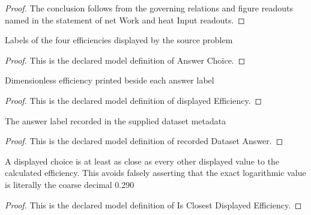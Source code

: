 \begin{proof}
  The conclusion follows from the governing relations and figure readouts named in the statement of net Work and heat Input readouts.
\end{proof}
\begin{definition}
  \label{def:physics:phyx-mini-0432:phyxminiproblems-problemphyxmini0432-answerchoice}
  Labels of the four efficiencies displayed by the source problem
\end{definition}
\begin{proof}
  This is the declared model definition of Answer Choice.
\end{proof}
\begin{definition}
  \label{def:physics:phyx-mini-0432:phyxminiproblems-problemphyxmini0432-displayedefficiency}
  Dimensionless efficiency printed beside each answer label
\end{definition}
\begin{proof}
  This is the declared model definition of displayed Efficiency.
\end{proof}
\begin{definition}
  \label{def:physics:phyx-mini-0432:phyxminiproblems-problemphyxmini0432-recordeddatasetanswer}
  The answer label recorded in the supplied dataset metadata
\end{definition}
\begin{proof}
  This is the declared model definition of recorded Dataset Answer.
\end{proof}
\begin{definition}
  \label{def:physics:phyx-mini-0432:phyxminiproblems-problemphyxmini0432-isclosestdisplayedefficiency}
  A displayed choice is at least as close as every other displayed value to the calculated efficiency. This avoids falsely asserting that the exact logarithmic value is literally the coarse decimal 0.290
\end{definition}
\begin{proof}
  This is the declared model definition of Is Closest Displayed Efficiency.
\end{proof}
